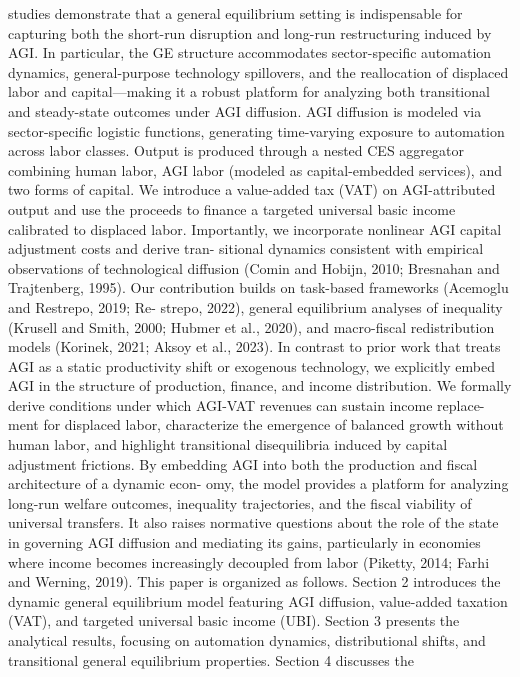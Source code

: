 studies demonstrate that a general equilibrium setting is indispensable for capturing both
the short-run disruption and long-run restructuring induced by AGI. In particular, the GE
structure accommodates sector-specific automation dynamics, general-purpose technology
spillovers, and the reallocation of displaced labor and capital—making it a robust platform
for analyzing both transitional and steady-state outcomes under AGI diffusion.
AGI diffusion is modeled via sector-specific logistic functions, generating time-varying
exposure to automation across labor classes. Output is produced through a nested CES
aggregator combining human labor, AGI labor (modeled as capital-embedded services), and
two forms of capital.
We introduce a value-added tax (VAT) on AGI-attributed output
and use the proceeds to finance a targeted universal basic income calibrated to displaced
labor. Importantly, we incorporate nonlinear AGI capital adjustment costs and derive tran-
sitional dynamics consistent with empirical observations of technological diffusion (Comin
and Hobijn, 2010; Bresnahan and Trajtenberg, 1995).
Our contribution builds on task-based frameworks (Acemoglu and Restrepo, 2019; Re-
strepo, 2022), general equilibrium analyses of inequality (Krusell and Smith, 2000; Hubmer
et al., 2020), and macro-fiscal redistribution models (Korinek, 2021; Aksoy et al., 2023). In
contrast to prior work that treats AGI as a static productivity shift or exogenous technology,
we explicitly embed AGI in the structure of production, finance, and income distribution.
We formally derive conditions under which AGI-VAT revenues can sustain income replace-
ment for displaced labor, characterize the emergence of balanced growth without human
labor, and highlight transitional disequilibria induced by capital adjustment frictions.
By embedding AGI into both the production and fiscal architecture of a dynamic econ-
omy, the model provides a platform for analyzing long-run welfare outcomes, inequality
trajectories, and the fiscal viability of universal transfers. It also raises normative questions
about the role of the state in governing AGI diffusion and mediating its gains, particularly
in economies where income becomes increasingly decoupled from labor (Piketty, 2014; Farhi
and Werning, 2019).
This paper is organized as follows. Section 2 introduces the dynamic general equilibrium
model featuring AGI diffusion, value-added taxation (VAT), and targeted universal basic
income (UBI). Section 3 presents the analytical results, focusing on automation dynamics,
distributional shifts, and transitional general equilibrium properties. Section 4 discusses the
